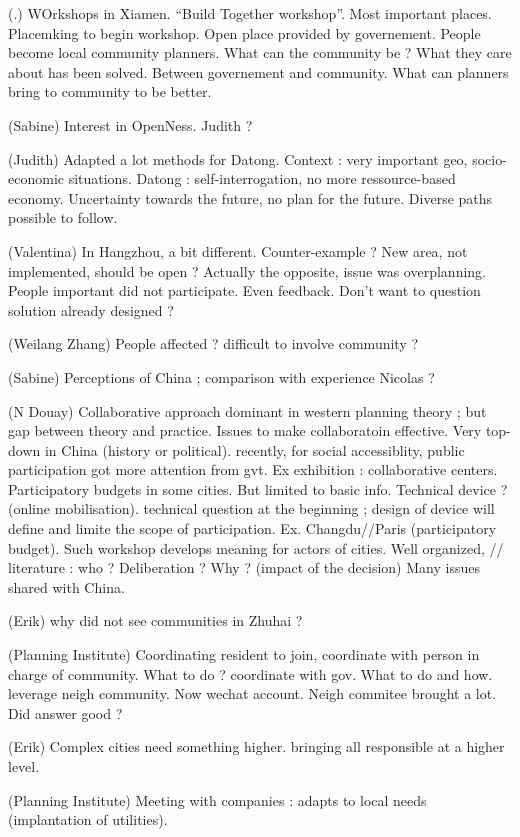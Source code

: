 (.) WOrkshops in Xiamen. ``Build Together workshop''. Most important places.  Placemking to begin workshop. Open place provided by governement. People become local community planners. What can the community be ? What they care about has been solved. Between governement and community. What can planners bring to community to be better.

(Sabine) Interest in OpenNess. Judith ?

(Judith) Adapted a lot methods for Datong. Context : very important geo, socio-economic situations. Datong : self-interrogation, no more ressource-based economy. Uncertainty towards the future, no plan for the future. Diverse paths possible to follow. 

(Valentina) In Hangzhou, a bit different. Counter-example ? New area, not implemented, should be open ? Actually the opposite, issue was overplanning. People important did not participate. Even feedback. Don't want to question solution already designed ?

(Weilang Zhang) People affected ? difficult to involve community ?

(Sabine) Perceptions of China ; comparison with experience Nicolas ?

(N Douay) Collaborative approach dominant in western planning theory ; but gap between theory and practice. Issues to make collaboratoin effective. Very top-down in China (history or political). recently, for social accessiblity, public participation got more attention from gvt. Ex exhibition : collaborative centers. Participatory budgets in some cities. But limited to basic info. Technical device ? (online mobilisation). technical question at the beginning ; design of device will define and limite the scope of participation. Ex. Changdu//Paris (participatory budget). Such workshop develops meaning for actors of cities. Well organized, // literature : who ? Deliberation ? Why ? (impact of the decision) Many issues shared with China.

(Erik) why did not see communities in Zhuhai ? 

(Planning Institute) Coordinating resident to join, coordinate with person in charge of community. What to do ? coordinate with gov. What to do and how. leverage neigh community. Now wechat account. Neigh commitee brought a lot. Did answer good ?

(Erik) Complex cities need something higher. bringing all responsible at a higher level.

(Planning Institute) Meeting with companies : adapts to local needs (implantation of utilities).

